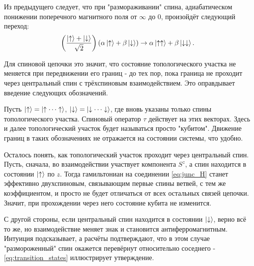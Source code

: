\documentclass[a4paper,12pt]{article}
\theoremstyle{plain} %
\theoremstyle{definition} %
\theoremstyle{remark} %
\begin{document}
Из предыдущего следует, что при "размораживании"$ $ спина, адиабатическом понижении поперечного магнитного поля от $\infty$ до $0$, произойдёт следующий переход:
\begin{equation*}
    \left( \frac{\ket{\uparrow} + \ket{\downarrow}}{\sqrt{2}} \right) (\alpha \ket{\uparrow} + \beta \ket{\downarrow}) \rightarrow \alpha \ket{\uparrow\uparrow} + \beta \ket{\downarrow\downarrow}.
\end{equation*}

Для спиновой цепочки это значит, что состояние топологического участка не меняется при передвижении его границ -  до тех пор, пока граница не проходит через центральный спин с трёхспиновым взаимодействием. Это оправдывает введение следующих обозначений.

Пусть $\ket{\uparrow} = \ket{\uparrow \dotsm \uparrow}$, $\ket{\downarrow} = \ket{\downarrow \dotsm \downarrow}$, где вновь указаны только спины топологического участка. Спиновый оператор $\tau$ действует на этих векторах. Здесь и далее топологический участок будет называться просто "кубитом"$ $. Движение границ в таких обозначениях не отражается на состоянии системы, что удобно. 

Осталось понять, как топологический участок проходит через центральный спин. Пусть, сначала, во взаимодействии участвует компонента $S^z$, а спин находится в состоянии $\ket{\uparrow}$ по $z$. Тогда гамильтониан на соединении \ref{eq:junc_H} станет эффективно двухспиновым, связывающим первые спины ветвей, с тем же коэффициентом, и просто не будет отличаться от всех остальных связей цепочки. Значит, при прохождении через него состояние кубита не изменится.

С другой стороны, если центральный спин находится в состоянии $\ket{\downarrow}$, верно всё то же, но взаимодействие меняет знак и становится антиферромагнитным. Интуиция подсказывает, а расчёты подтверждают, что в этом случае "размороженный"$ $ спин окажется перевёрнут относительно соседнего - \ref{eq:transition_states} иллюстрирует утверждение.
\end{document}
